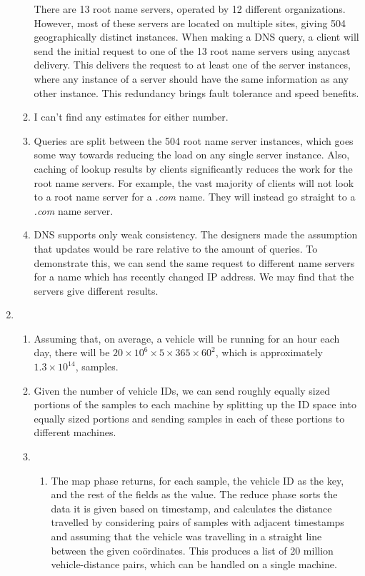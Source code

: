 \documentclass{article}
\begin{document}
\begin{enumerate}
\begin{enumerate}
        There are 13 root name servers, operated by 12 different organizations. However, most of these servers are located on multiple sites, giving 504 geographically distinct instances. When making a DNS query, a client will send the initial request to one of the 13 root name servers using anycast delivery. This delivers the request to at least one of the server instances, where any instance of a server should have the same information as any other instance. This redundancy brings fault tolerance and speed benefits.
      \item I can't find any estimates for either number.
      \item Queries are split between the 504 root name server instances, which goes some way towards reducing the load on any single server instance. Also, caching of lookup results by clients significantly reduces the work for the root name servers. For example, the vast majority of clients will not look to a root name server for a \textit{.com} name. They will instead go straight to a \textit{.com} name server.
      \item DNS supports only weak consistency. The designers made the assumption that updates would be rare relative to the amount of queries. To demonstrate this, we can send the same request to different name servers for a name which has recently changed IP address. We may find that the servers give different results.
    \end{enumerate}
  \item
    \begin{enumerate}
      \item Assuming that, on average, a vehicle will be running for an hour each day, there will be $20 \times 10^6 \times 5 \times 365 \times 60^2$, which is approximately $1.3 \times 10^{14}$, samples.
      \item Given the number of vehicle IDs, we can send roughly equally sized portions of the samples to each machine by splitting up the ID space into equally sized portions and sending samples in each of these portions to different machines.
      \item
        \begin{enumerate}
          \item The map phase returns, for each sample, the vehicle ID as the key, and the rest of the fields as the value. The reduce phase sorts the data it is given based on timestamp, and calculates the distance travelled by considering pairs of samples with adjacent timestamps and assuming that the vehicle was travelling in a straight line between the given co\"ordinates. This produces a list of 20 million vehicle-distance pairs, which can be handled on a single machine.

\end{enumerate}
\end{enumerate}
\end{enumerate}
\end{document}
